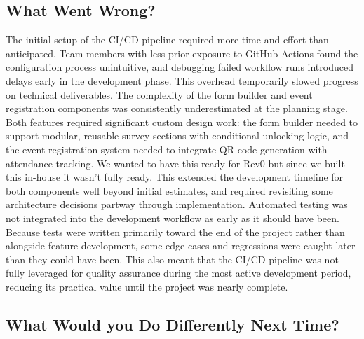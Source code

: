 \documentclass{article}
\begin{document}
\subsection{What Went Wrong?}

The initial setup of the CI/CD pipeline required more time and effort than anticipated. Team members with less prior exposure to GitHub Actions found the configuration process unintuitive, and debugging failed workflow runs introduced delays early in the development phase. This overhead temporarily slowed progress on technical deliverables.
\newline\newline
The complexity of the form builder and event registration components was consistently underestimated at the planning stage. Both features required significant custom design work: the form builder needed to support modular, reusable survey sections with conditional unlocking logic, and the event registration system needed to integrate QR code generation with attendance tracking. We wanted to have this ready for Rev0 but since we built this in-house it wasn't fully ready. This extended the development timeline for both components well beyond initial estimates, and required revisiting some architecture decisions partway through implementation.
\newline\newline
Automated testing was not integrated into the development workflow as early as it should have been. Because tests were written primarily toward the end of the project rather than alongside feature development, some edge cases and regressions were caught later than they could have been. This also meant that the CI/CD pipeline was not fully leveraged for quality assurance during the most active development period, reducing its practical value until the project was nearly complete.

\subsection{What Would you Do Differently Next Time?}
\end{document}
